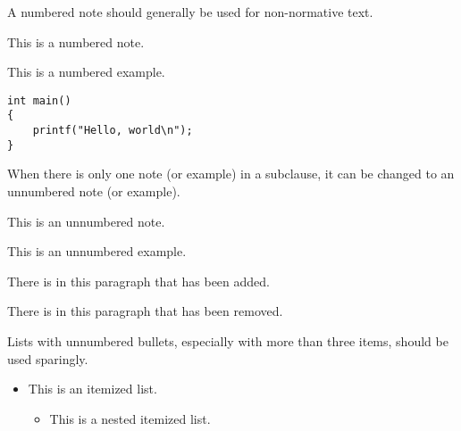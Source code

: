 \begin{comment}
Supposedly this is a comment.
\end{comment}


A numbered note should generally be used for non-normative text.

\begin{note}
This is a numbered note.
\end{note}

\begin{example}
This is a numbered example.
\end{example}

\begin{verbatim}
int main()
{
    printf("Hello, world\n");
}
\end{verbatim}


When there is only one note (or example) in a subclause,
it can be changed to an unnumbered note (or example).

\begin{anote}
This is an unnumbered note.
\end{anote}

\begin{anexample}
This is an unnumbered example.
\end{anexample}

There is
in this paragraph that has been added.

There is
in this paragraph that has been removed.


Lists with unnumbered bullets, especially with more than three items,
should be used sparingly.

\begin{itemize}
\item
This is an itemized list.
\begin{itemize}
\item
This is a nested itemized list.
\end{itemize}
\end{itemize}

